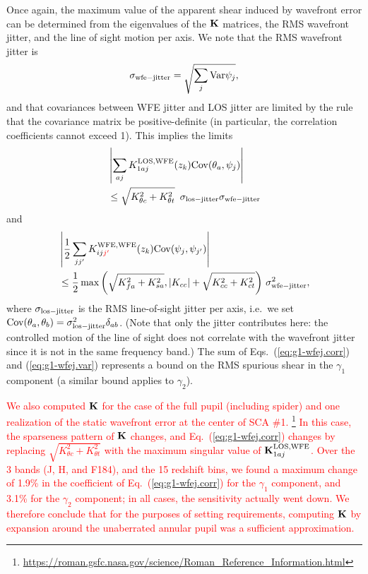 \documentclass[usenatbib]{mnras}
\newcommand{\changetext}[1]{\textcolor{red}{#1}}
\begin{document}
Once again, the maximum value of the apparent shear induced by
wavefront error can be determined from the eigenvalues of the ${\bf
K}$ matrices, the RMS wavefront jitter, and the line of sight motion
per axis. We note that the RMS wavefront jitter is
\begin{equation}
\sigma_{\rm wfe-jitter} = \sqrt{\sum_j {\rm Var} \psi_j},
\end{equation}
and that covariances between WFE jitter and LOS jitter are limited by the rule that the covariance matrix be positive-definite (in particular, the correlation coefficients cannot exceed 1). This implies the limits
\begin{align}
&\left|\sum_{aj} K^{\rm LOS,WFE}_{1aj}(z_k) {\rm
Cov}({\theta}_a,{\psi}_j)\right| \nonumber\\
&\le \sqrt{K_{\theta c}^2 + K_{\theta
t}^2}~\, \sigma_{\rm los-jitter} \sigma_{\rm wfe-jitter}
\label{eq:g1-wfej.corr}
\end{align}
and
\begin{align}
&\left|\frac12 \sum_{jj'} K^{\rm WFE,WFE}_{ij\changetext{j'}}(z_k) {\rm
Cov}({\psi}_j,{\psi}_{j'})\right| \nonumber\\
&\le \frac12 \max\left(
\sqrt{K_{fa}^2+K_{sa}^2}, |K_{cc}|+\sqrt{K_{cc}^2+K_{ct}^2}
\right)\,\sigma_{\rm wfe-jitter}^2,
\label{eq:g1-wfej.var}
\end{align}
where $\sigma_{\rm los-jitter}$ is the RMS line-of-sight jitter per
axis, i.e.\ we set ${\rm Cov}(\theta_a,\theta_b) = \sigma_{\rm
los-jitter}^2\delta_{ab}$. (Note that only the jitter contributes
here: the controlled motion of the line of sight does not correlate
with the wavefront jitter since it is not in the same frequency band.)
The sum of Eqs.~(\ref{eq:g1-wfej.corr}) and (\ref{eq:g1-wfej.var})
represents a bound on the RMS spurious shear in the $\gamma_1$
component (a similar bound applies to $\gamma_2$).

\changetext{We also computed ${\bf K}$ for the case of the full pupil (including spider) and one realization of the static wavefront error at the center of SCA \#1. \footnote{\url{https://roman.gsfc.nasa.gov/science/Roman\_Reference\_Information.html}} In this case, the sparseness pattern of ${\bf K}$ changes, and Eq.~(\ref{eq:g1-wfej.corr}) changes by replacing $\sqrt{K_{\theta c}^2 + K_{\theta t}^2}$ with the maximum singular value of ${\bf K}^{\rm LOS,WFE}_{1aj}$. Over the 3 bands (J, H, and F184), and the 15 redshift bins, we found a maximum change of 1.9\% in the coefficient of Eq.~(\ref{eq:g1-wfej.corr}) for the $\gamma_1$ component, and 3.1\% for the $\gamma_2$ component; in all cases, the sensitivity actually went down. We therefore conclude that for the purposes of setting requirements, computing ${\bf K}$ by expansion around the unaberrated annular pupil was a sufficient approximation.}
\end{document}
